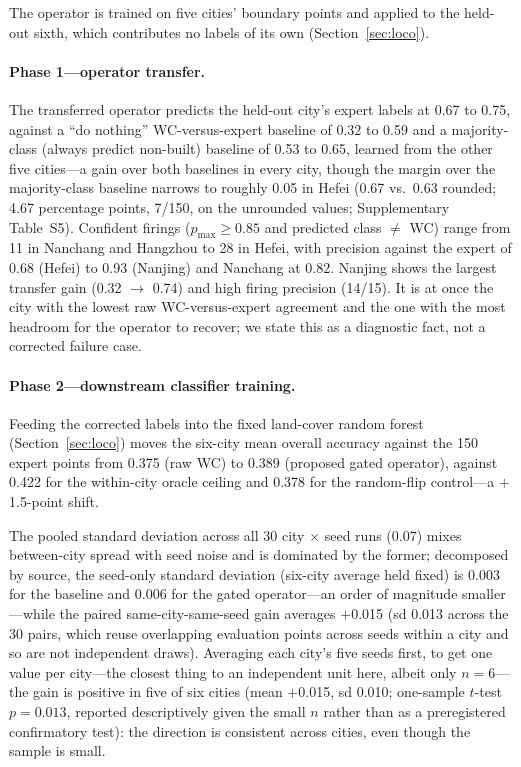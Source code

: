 \documentclass[remotesensing,article,submit,moreauthors]{Definitions/mdpi}
\begin{document}
The operator is trained on five cities' boundary points and applied to the
held-out sixth, which contributes no labels of its own (Section~\ref{sec:loco}).

\paragraph{Phase 1---operator transfer.}
The transferred operator predicts the held-out city's expert labels at 0.67 to
0.75, against a ``do nothing'' WC-versus-expert baseline of 0.32 to 0.59 and a
majority-class (always predict non-built) baseline of 0.53 to 0.65, learned
from the other five cities---a gain over both baselines in every city, though
the margin over the majority-class baseline narrows to roughly 0.05 in
Hefei (0.67 vs.\ 0.63 rounded; 4.67 percentage points, 7/150, on the unrounded
values; Supplementary Table~S5). Confident firings ($p_{\max} \ge
0.85$ and predicted class $\neq$ WC) range from 11 in Nanchang and Hangzhou to
28 in Hefei, with precision against the expert of 0.68 (Hefei) to 0.93 (Nanjing)
and Nanchang at 0.82. Nanjing shows the largest transfer gain (0.32 $\to$ 0.74)
and high firing precision (14/15). It is at once the city with the lowest raw
WC-versus-expert agreement and the one with the most headroom for the operator
to recover; we state this as a diagnostic fact, not a corrected failure case.

\paragraph{Phase 2---downstream classifier training.}
Feeding the corrected labels into the fixed land-cover random forest
(Section~\ref{sec:loco}) moves the six-city mean overall accuracy against the
150 expert points from 0.375 (raw WC) to 0.389 (proposed gated operator),
against 0.422 for the within-city oracle ceiling and 0.378 for the
random-flip control---a $+$1.5-point shift.

The pooled standard deviation
across all 30 city $\times$ seed runs (0.07) mixes between-city spread with
seed noise and is dominated by the former; decomposed by source, the
seed-only standard deviation (six-city average held fixed) is 0.003 for the
baseline and 0.006 for the gated operator---an order of magnitude
smaller---while the paired same-city-same-seed gain averages $+$0.015 (sd
0.013 across the 30 pairs, which reuse overlapping evaluation points across
seeds within a city and so are not independent draws). Averaging each city's
five seeds first, to get one value per city---the closest thing to an
independent unit here, albeit only $n = 6$---the gain is positive in five of
six cities (mean $+$0.015, sd 0.010; one-sample $t$-test $p = 0.013$,
reported descriptively given the small $n$ rather than as a preregistered
confirmatory test): the direction is consistent across cities, even though
the sample is small.
\end{document}

